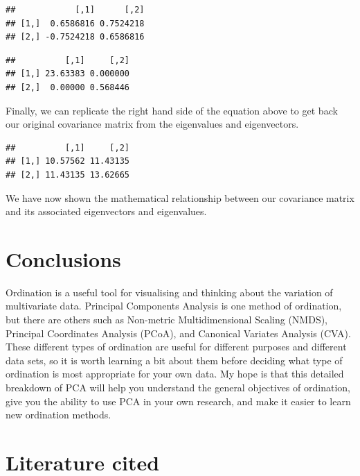 \documentclass[]{article}
\newenvironment{Shaded}{\begin{snugshade}}{\end{snugshade}}
\newcommand{\NormalTok}[1]{#1}
\newcommand{\OperatorTok}[1]{\textcolor[rgb]{0.81,0.36,0.00}{\textbf{#1}}}
\newcommand{\StringTok}[1]{\textcolor[rgb]{0.31,0.60,0.02}{#1}}
\begin{document}
\begin{verbatim}
##            [,1]      [,2]
## [1,]  0.6586816 0.7524218
## [2,] -0.7524218 0.6586816
\end{verbatim}

\begin{verbatim}
##          [,1]     [,2]
## [1,] 23.63383 0.000000
## [2,]  0.00000 0.568446
\end{verbatim}

Finally, we can replicate the right hand side of the equation above to
get back our original covariance matrix from the eigenvalues and
eigenvectors.

\begin{Shaded}
\end{Shaded}

\begin{verbatim}
##          [,1]     [,2]
## [1,] 10.57562 11.43135
## [2,] 11.43135 13.62665
\end{verbatim}

We have now shown the mathematical relationship between our covariance
matrix and its associated eigenvectors and eigenvalues.

\hypertarget{conclusions}{%
\section{Conclusions}\label{conclusions}}

Ordination is a useful tool for visualising and thinking about the
variation of multivariate data. Principal Components Analysis is one
method of ordination, but there are others such as Non-metric
Multidimensional Scaling (NMDS), Principal Coordinates Analysis (PCoA),
and Canonical Variates Analysis (CVA). These different types of
ordination are useful for different purposes and different data sets, so
it is worth learning a bit about them before deciding what type of
ordination is most appropriate for your own data. My hope is that this
detailed breakdown of PCA will help you understand the general
objectives of ordination, give you the ability to use PCA in your own
research, and make it easier to learn new ordination methods.

\hypertarget{literature-cited}{%
\section*{Literature cited}\label{literature-cited}}
\end{document}
